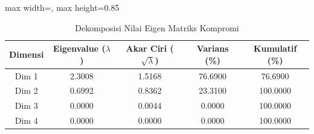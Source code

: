 \begin{table}[H]
\centering
\caption{Dekomposisi Nilai Eigen Matriks Kompromi} \label{tab:sampleeigen}
\begin{adjustbox}{max width=\textwidth, max height=0.85\textheight}
\begin{tabular}{|c|c|c|c|c|}
\hline
\textbf{Dimensi} & \textbf{Eigenvalue ($\lambda$)} & \textbf{Akar Ciri ($\sqrt{\lambda}$)} & \textbf{Varians (\%)} & \textbf{Kumulatif (\%)} \\
\hline
Dim 1 & 2.3008 & 1.5168 & 76.6900 & 76.6900 \\
Dim 2 & 0.6992 & 0.8362 & 23.3100 & 100.0000 \\
Dim 3 & 0.0000 & 0.0044 & 0.0000 & 100.0000 \\
Dim 4 & 0.0000 & 0.0000 & 0.0000 & 100.0000 \\
\hline
\end{tabular}
\end{adjustbox}
\end{table}